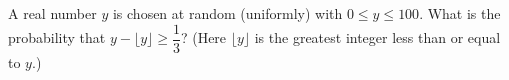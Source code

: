 A real number $y$ is chosen at random (uniformly) with $0\le y\le100$. What is the probability that $y-\lfloor y\rfloor\ge\dfrac{1}{3}$? (Here $\lfloor y\rfloor$ is the greatest integer less than or equal to $y$.)
